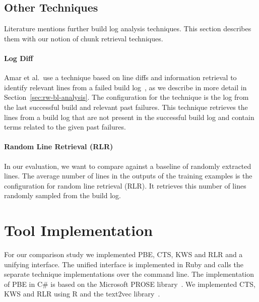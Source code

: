 \documentclass[\myrootdir/main.tex]{subfiles}
\begin{document}
\subsection{Other Techniques}
\label{sec:expl-rlr}
Literature mentions further build log analysis techniques.
This section describes them with our notion of chunk retrieval techniques.

\paragraph{Log Diff}
Amar et al.\ use a technique based on line diffs and information retrieval to identify relevant lines from a failed build log~\cite{amar2019mining}, as we describe in more detail in Section~\ref{sec:rw-bl-analysis}.
The configuration for the technique is the log from the last successful build and relevant past failures.
This technique retrieves the lines from a build log that are not present in the successful build log and contain terms related to the given past failures.

\paragraph{Random Line Retrieval (RLR)}
In our evaluation, we want to compare against a baseline of randomly extracted lines.
The average number of lines in the outputs of the training examples is the configuration for random line retrieval (RLR).
It retrieves this number of lines randomly sampled from the build log.

\section{Tool Implementation}
For our comparison study we implemented PBE, CTS, KWS and RLR and a unifying interface.
The unified interface is implemented in Ruby and calls the separate technique implementations over the command line.
The implementation of PBE in C\# is based on the Microsoft PROSE library~\cite{prose2019webpage}.
We implemented CTS, KWS and RLR using R and the text2vec library~\cite{text2vec2019webpage}.
\end{document}
